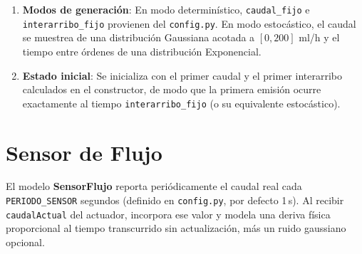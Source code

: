 \documentclass[12pt, a4paper]{article}
\begin{document}
\begin{enumerate}
    \item \textbf{Modos de generación}: En modo determinístico, \texttt{caudal\_fijo}
    e \texttt{interarribo\_fijo} provienen del \texttt{config.py}. En modo estocástico,
    el caudal se muestrea de una distribución Gaussiana acotada a $[0, 200]$ ml/h y
    el tiempo entre órdenes de una distribución Exponencial.

    \item \textbf{Estado inicial}: Se inicializa con el primer caudal y el primer
    interarribo calculados en el constructor, de modo que la primera emisión ocurre
    exactamente al tiempo \texttt{interarribo\_fijo} (o su equivalente estocástico).
\end{enumerate}


\section{Sensor de Flujo}

El modelo \textbf{SensorFlujo} reporta periódicamente el caudal real cada
\texttt{PERIODO\_SENSOR} segundos (definido en \texttt{config.py}, por defecto 1\,s).
Al recibir \texttt{caudalActual} del actuador, incorpora ese valor y modela una deriva
física proporcional al tiempo transcurrido sin actualización, más un ruido gaussiano
opcional.
\end{document}
